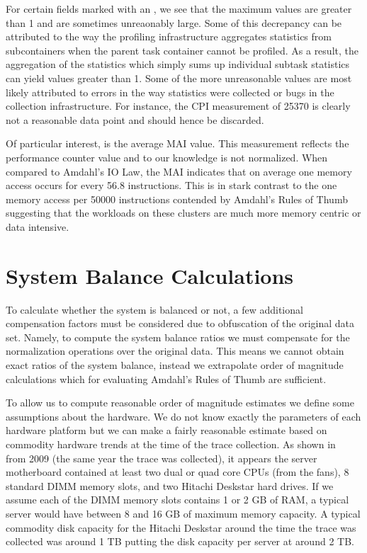 \documentclass{sig-alternate}
\begin{document}
For certain fields marked with an \*, we see that the maximum values are greater than 1 and are sometimes unreaonably large.
Some of this decrepancy can be attributed to the way the profiling infrastructure aggregates statistics from subcontainers when the parent task container cannot be profiled.
As a result, the aggregation of the statistics which simply sums up individual subtask statistics can yield values greater than 1.
Some of the more unreasonable values are most likely attributed to errors in the way statistics were collected or bugs in the collection infrastructure.
For instance, the CPI measurement of 25370 is clearly not a reasonable data point and should hence be discarded.

Of particular interest, is the average MAI value.
This measurement reflects the performance counter value and to our knowledge is not normalized.
When compared to Amdahl's IO Law, the MAI indicates that on average one memory access occurs for every 56.8 instructions.
This is in stark contrast to the one memory access per 50000 instructions contended by Amdahl's Rules of Thumb suggesting that the workloads on these clusters are much more memory centric or data intensive.

\section{System Balance Calculations}

To calculate whether the system is balanced or not, a few additional compensation factors must be considered due to obfuscation of the original data set.
Namely, to compute the system balance ratios we must compensate for the normalization operations over the original data.
This means we cannot obtain exact ratios of the system balance, instead we extrapolate order of magnitude calculations which for evaluating Amdahl's Rules of Thumb are sufficient.

To allow us to compute reasonable order of magnitude estimates we define some assumptions about the hardware.
We do not know exactly the parameters of each hardware platform but we can make a fairly reasonable estimate based on commodity hardware trends at the time of the trace collection.
As shown in ~\cite{googlehw} from 2009 (the same year the trace was collected), it appears the server motherboard contained at least two dual or quad core CPUs (from the fans), 8 standard DIMM memory slots, and two Hitachi Deskstar hard drives.
If we assume each of the DIMM memory slots contains 1 or 2 GB of RAM, a typical server would have between 8 and 16 GB of maximum memory capacity.
A typical commodity disk capacity for the Hitachi Deskstar around the time the trace was collected was around 1 TB putting the disk capacity per server at around 2 TB.
\end{document}
